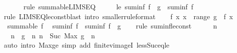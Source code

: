 \begin{isabellebody}
\ \ \ \ \isamarkupfalse%
\ {\isacharparenleft}{\kern0pt}rule\ summable{\isacharunderscore}{\kern0pt}LIMSEQ{\isacharparenright}{\kern0pt}\isanewline
\ \ \isamarkupfalse%
\ \isamarkupfalse%
\ le{\isacharcolon}{\kern0pt}\ {\isachardoublequoteopen}suminf\ {\isacharparenleft}{\kern0pt}f\ {\isasymcirc}\ g{\isacharparenright}{\kern0pt}\ {\isasymle}\ suminf\ f{\isachardoublequoteclose}\isanewline
\ \ \ \ \isamarkupfalse%
{\isacharparenleft}{\kern0pt}rule\ LIMSEQ{\isacharunderscore}{\kern0pt}le{\isacharunderscore}{\kern0pt}const{}{\isacharparenright}{\kern0pt}{\isacharparenleft}{\kern0pt}blast\ intro{\isacharcolon}{\kern0pt}\ smaller{\isacharbrackleft}{\kern0pt}rule{\isacharunderscore}{\kern0pt}format{\isacharbrackright}{\kern0pt}{\isacharparenright}{\kern0pt}\isanewline
\isanewline
\ \ \isamarkupfalse%
\ f{\isacharcolon}{\kern0pt}\ {\isachardoublequoteopen}{\isasymAnd}x{\isachardot}{\kern0pt}\ x\ {\isasymnotin}\ range\ g\ {\isasymLongrightarrow}\ f\ x\ {\isacharequal}{\kern0pt}\ {}{\isachardoublequoteclose}\isanewline
\isanewline
\ \ \isamarkupfalse%
\ {\isacartoucheopen}summable\ f{\isacartoucheclose}\ \isamarkupfalse%
\ {\isachardoublequoteopen}suminf\ f\ {\isasymle}\ suminf\ {\isacharparenleft}{\kern0pt}f\ {\isasymcirc}\ g{\isacharparenright}{\kern0pt}{\isachardoublequoteclose}\isanewline
\ \ \isamarkupfalse%
\ {\isacharparenleft}{\kern0pt}rule\ suminf{\isacharunderscore}{\kern0pt}le{\isacharunderscore}{\kern0pt}const{\isacharparenright}{\kern0pt}\isanewline
\ \ \ \ \isamarkupfalse%
\ n\isanewline
\ \ \ \ \isamarkupfalse%
\ {\isachardoublequoteopen}{\isasymforall}\ n{\isacharprime}{\kern0pt}\ {\isasymin}\ {\isacharparenleft}{\kern0pt}g\ {\isacharminus}{\kern0pt}{\isacharbackquote}{\kern0pt}\ {\isacharbraceleft}{\kern0pt}{\isachardot}{\kern0pt}{\isachardot}{\kern0pt}{\isacharless}{\kern0pt}n{\isacharbraceright}{\kern0pt}{\isacharparenright}{\kern0pt}{\isachardot}{\kern0pt}\ n{\isacharprime}{\kern0pt}\ {\isacharless}{\kern0pt}\ Suc\ {\isacharparenleft}{\kern0pt}Max\ {\isacharparenleft}{\kern0pt}g\ {\isacharminus}{\kern0pt}{\isacharbackquote}{\kern0pt}\ {\isacharbraceleft}{\kern0pt}{\isachardot}{\kern0pt}{\isachardot}{\kern0pt}{\isacharless}{\kern0pt}n{\isacharbraceright}{\kern0pt}{\isacharparenright}{\kern0pt}{\isacharparenright}{\kern0pt}{\isachardoublequoteclose}\isanewline
\ \ \ \ \ \ \isamarkupfalse%
{\isacharparenleft}{\kern0pt}auto\ intro{\isacharcolon}{\kern0pt}\ Max{\isacharunderscore}{\kern0pt}ge\ simp\ add{\isacharcolon}{\kern0pt}\ finite{\isacharunderscore}{\kern0pt}vimageI\ less{\isacharunderscore}{\kern0pt}Suc{\isacharunderscore}{\kern0pt}eq{\isacharunderscore}{\kern0pt}le{\isacharparenright}{\kern0pt}\isanewline

\end{isabellebody}
